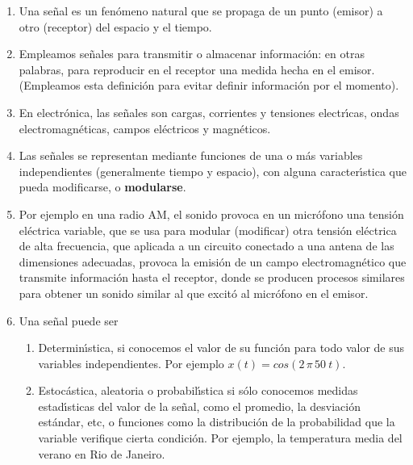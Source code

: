 \begin{enumerate}

\item Una se\~{n}al es un fen\'{o}meno natural que se propaga de un punto (emisor) a otro (receptor) del espacio y el tiempo. 

\item Empleamos señales para transmitir o almacenar información: en otras palabras, para reproducir en el receptor una medida hecha en el emisor. (Empleamos esta definición para evitar definir información por el momento).

\item En electr\'{o}nica, las se\~{n}ales son cargas, corrientes y tensiones electr\'{\i}cas, ondas electromagnéticas, campos eléctricos y magnéticos.

\item Las se\~{n}ales se representan mediante
  funciones de una o m\'{a}s variables independientes (generalmente
  tiempo y espacio), con alguna caracter\'{\i}stica que pueda
  modificarse, o \textbf{modularse}.

\item Por ejemplo en una radio AM, el sonido provoca en un micrófono una tensión eléctrica variable,
que se usa para modular (modificar) otra tensión eléctrica de alta frecuencia, que aplicada a un circuito 
conectado a una antena de las dimensiones adecuadas, provoca la emisi\'{o}n de un campo electromagn\'{e}tico 
que transmite informaci\'{o}n hasta el receptor, donde se producen procesos similares para obtener un sonido similar al que excitó al micrófono en el emisor.




\item Una se\~{n}al puede ser
  \begin{enumerate}
  \item Determin\'{\i}stica, si conocemos el valor de su funci\'{o}n
    para todo valor de sus variables independientes. 
    Por ejemplo $x(t) = cos(2 \, \pi \, 50 \ t)$.
      
  \item Estoc\'{a}stica, aleatoria o probabil\'{\i}stica si s\'{o}lo
    conocemos medidas estad\'{\i}sticas del valor de la se\~{n}al,
    como el promedio, la desviaci\'{o}n est\'{a}ndar, etc, o funciones
    como la distribuci\'{o}n de la probabilidad que la variable
    verifique cierta condici\'{o}n. Por ejemplo, la temperatura media del verano en
    Rio de Janeiro.
  \end{enumerate}

\end{enumerate}

